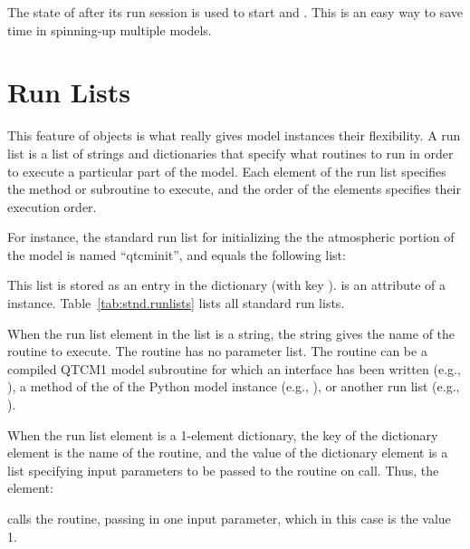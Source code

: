 The state of  after its run session is used to start
 and .  This is an easy way to save time
in spinning-up multiple models.




\section{Run Lists}		\label{sec:runlist.intro}

This feature of  objects is what really gives 
 model instances their flexibility.
A run list is a list of strings and dictionaries that specify
what routines to run in order to execute a particular part of
the model.  Each element of the run list specifies the method
or subroutine to execute, and the order of the elements specifies
their execution order.

For instance, the standard run list for initializing the the
atmospheric portion of the model is named ``qtcminit'', and
equals the following list:

\begin{latexonly}
\begin{codeblock}
\codeblockfont{%
\parbox{46ex}{}}
\end{codeblock}
\end{latexonly}

\begin{htmlonly}
\begin{quotation}

\end{quotation}
\end{htmlonly}

This list is stored as an entry in the  dictionary
(with key ).
 is an attribute of a  instance.
Table~\ref{tab:stnd.runlists} lists all standard run lists.

When the run list element in the list is a string, the string gives the
name of the routine to execute.  The routine has no parameter
list.  The routine can be a
compiled QTCM1 model subroutine for which an interface has been
written (e.g., ), 
a method of the of the Python model instance 
(e.g., ), or another run list
(e.g., ).

When the run list element is a 1-element dictionary, the key of
the dictionary element is the name of the routine, and the value
of the dictionary element is a list specifying input parameters
to be passed to the routine on call.  Thus, the element:
\begin{codeblock}
\end{codeblock}
calls the  routine, passing in
one input parameter, which in this case is the value 1.

